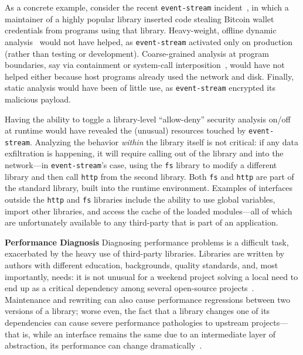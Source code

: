 \documentclass[letterpaper,twocolumn,10pt]{article}
\newcommand{\heading}[1]{\vspace{2pt}\noindent\textbf{#1}\enspace}
\newcommand{\ttt}[1]{\texttt{#1}}
\newcommand{\fixme}[1]{{\color{red}#1}}
\begin{document}
As a concrete example, consider the recent \ttt{event-stream} incident~\cite{es1, es2}, in which a maintainer of a highly popular library inserted code stealing Bitcoin wallet credentials from programs using that library.
Heavy-weight, offline dynamic analysis~\cite{jalangi} would not have helped, as \ttt{event-stream} activated only on production (rather than testing or development).
Coarse-grained analysis at program boundaries, say via containment or system-call interposition~\cite{systrace:03}, would have not helped either because host programs already used the network and disk.
Finally, static analysis would have been of little use, as \ttt{event-stream} encrypted its malicious payload.

Having the ability to toggle a library-level ``allow-deny'' security analysis on/off at runtime would have revealed the (unusual) resources touched by \ttt{event-stream}.
Analyzing the behavior \emph{within} the library itself is not critical:
  if any data exfiltration is happening, it will require calling out of the library and into the network---in \ttt{event-stream}'s case, using the \ttt{fs} library to modify a different library and then call \ttt{http} from the second library.
Both \ttt{fs} and \ttt{http} are part of the standard library, built into the runtime environment.
Examples of interfaces outside the \ttt{http} and \ttt{fs} libraries include the ability to use global variables, import other libraries, and access the cache of the loaded modules---all of which are unfortunately available to any third-party that is part of an application.


\heading{Performance Diagnosis}
Diagnosing performance problems is a difficult task, exacerbated by the heavy use of third-party libraries.
Libraries are written by authors with different education, backgrounds, quality standards, and, most importantly, needs:
  it is not unusual for a weekend project solving a local need to end up as a critical dependency among several open-source projects~\cite{cheapcomplexity}.
Maintenance and rewriting can also cause performance regressions between two versions of a library;
  worse even, the fact that a library changes one of its dependencies can cause severe performance pathologies to upstream projects---that is, while an interface remains the same due to an intermediate layer of abstraction, its performance can change dramatically~\cite{jest}.
\end{document}
